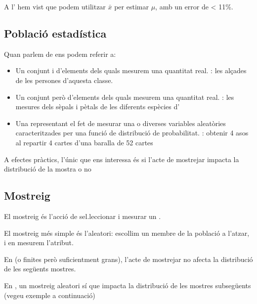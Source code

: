 \documentclass[letterpaper,10pt,english]{sphinxmanual}
\begin{document}
A l’
hem vist que podem utilitzar \(\bar{x}\) per estimar \(\mu\), amb un error de \textless{} 11\%.


\subsection{Població estadística}
\label{\detokenize{0_Intro/0_2_Intro_stats:poblacio-estadistica}}
Quan parlem de  ens podem referir a:
\begin{itemize}
\item {} 
Un conjunt  i  d’elements dels quals mesurem una quantitat real. : les alçades de les persones d’aquesta classe.

\item {} 
Un conjunt  però  d’elements dels quals mesurem una quantitat real. : les mesures dels sèpals i pètals de les diferents espècies d’

\item {} 
Una  representant el fet de mesurar una o diverses variables aleatòries caracteritzades per una funció de distribució de probabilitat. : obtenir 4 asos al repartir 4 cartes d’una baralla de 52 cartes

\end{itemize}

A efectes pràctics, l’únic que ens interessa és si l’acte de mostrejar impacta la distribució de la mostra o no


\subsection{Mostreig}
\label{\detokenize{0_Intro/0_2_Intro_stats:id1}}
El mostreig és l’acció de sel.leccionar i mesurar un .

El mostreig més simple és l’aleatori: escollim un membre de la població a l’atzar, i en mesurem l’atribut.

En  (o finites però suficientment grans), l’acte de mostrejar no afecta la distribució de les següents mostres.

En , un mostreig aleatori  sí que impacta la distribució de les mostres
subsegüents (vegeu exemple a continuació)
\end{document}
